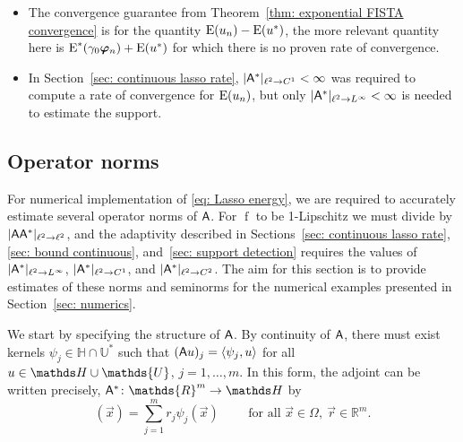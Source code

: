 \documentclass[smallextended]{svjour3}
\let\F\mathds\let\C\mathcal\newcommand{\R}{\F{R}}\newcommand{\A}{\tens{A}}
\newcommand{\IP}[2]{\left\langle #1,#2 \right\rangle}
\newcommand{\op}[1]{\operatorname{#1}}
\newcommand{\1}{\F{1}}
\newcommand{\Domain}{\Omega}\newcommand{\domain}{\omega}
\newcommand*{\var}[1]{%
	\IfEqCase{#1}{%
		{0}{u}%
		{1}{v}%
		{2}{w}%
	}[u#1]%
}
\newcommand*{\vars}[1]{%
	\IfEqCase{#1}{%
		{0}{\alpha}%
		{1}{\beta}%
		{2}{\gamma}%
		{3}{a}%
		{4}{b}%
		{5}{c}%
	}[k#1]%
}
\begin{document}
	\begin{itemize}
		\item The convergence guarantee from Theorem~\ref{thm: exponential FISTA convergence} is for the quantity $\op{E}(\var0_n)-\op{E}(\var0^*)$, the more relevant quantity here is $\op{E}^*(\vars2_0\vec{\varphi}_n)+\op{E}(\var0^*)$ for which there is no proven rate of convergence.
		\item In Section~\ref{sec: continuous lasso rate}, $|\A^*|_{\ell^2\to C^1}<\infty$ was required to compute a rate of convergence for $\op{E}(\var0_n)$, but only $|\A^*|_{\ell^2\to L^\infty}<\infty$ is needed to estimate the support.
	\end{itemize}
	
	
	\subsection{Operator norms}\label{sec: smoothing operators}
	For numerical implementation of \eqref{eq: Lasso energy}, we are required to accurately estimate several operator norms of $\A$. For $\op{f}$ to be 1-Lipschitz we must divide by $|\A\A^*|_{\ell^2\to\ell^2}$, and the adaptivity described in Sections~\ref{sec: continuous lasso rate}, \ref{sec: bound continuous}, and~\ref{sec: support detection} requires the values of $|\A^*|_{\ell^2\to L^\infty}$, $|\A^*|_{\ell^2\to C^1}$, and $|\A^*|_{\ell^2\to C^2}$. The aim for this section is to provide estimates of these norms and seminorms for the numerical examples presented in Section~\ref{sec: numerics}.
	
	We start by specifying the structure of $\A$. By continuity of $\A$, there must exist kernels $\psi_j\in \F H\cap\F{U}^*$ such that $(\A\var0)_j = \IP{\psi_j}{\var0}$ for all $\var0\in \F H\cup\F{U}$, $j=1,\ldots,m$. In this form, the adjoint can be written precisely, $\A^*\colon\R^m\to \F H$ by 
	\begin{equation}
		[\A^*\vec{r}](\vec{x}) = \sum_{j=1}^m r_j\psi_j(\vec{x}) \qquad \text{ for all }\vec{x}\in\Domain,\ \vec{r}\in\R^m.
	\end{equation}
	
\end{document}
